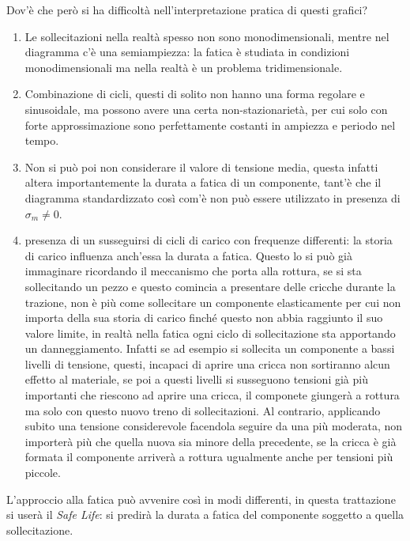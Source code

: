 		Dov'è che però si ha difficoltà nell'interpretazione pratica di questi grafici? 
		\begin{enumerate}
			
		\item Le sollecitazioni nella realtà spesso non sono monodimensionali, mentre nel diagramma c'è una semiampiezza: la fatica è studiata in condizioni monodimensionali ma nella realtà è un problema tridimensionale.
		
		\item Combinazione di cicli, questi di solito non hanno una forma regolare e sinusoidale, ma possono avere una certa non-stazionarietà, per cui solo con forte approssimazione sono perfettamente costanti in ampiezza e periodo nel tempo. 
		
		\item Non si può poi non considerare il valore di tensione media, questa infatti altera importantemente la durata a fatica di un componente, tant'è che il diagramma standardizzato così com'è non può essere utilizzato in presenza di $\sigma_m\ne0$.
		
		\item presenza di un susseguirsi di cicli di carico con frequenze differenti: la storia di carico influenza anch'essa la durata a fatica. Questo lo si può già immaginare ricordando il meccanismo che porta alla rottura, se si sta sollecitando un pezzo e questo comincia a presentare delle cricche durante la trazione, non è più come sollecitare un componente elasticamente per cui non importa della sua storia di carico finché questo non abbia raggiunto il suo valore limite, in realtà nella fatica ogni ciclo di sollecitazione sta apportando un danneggiamento. Infatti se ad esempio si sollecita un componente a bassi livelli di tensione, questi, incapaci di aprire una cricca non sortiranno alcun effetto al materiale, se poi a questi livelli si susseguono tensioni già più importanti che riescono ad aprire una cricca, il componete giungerà a rottura ma solo con questo nuovo treno di sollecitazioni. Al contrario, applicando subito una tensione considerevole facendola seguire da una più moderata, non importerà più che quella nuova sia minore della precedente, se la cricca è già formata il componente arriverà a rottura ugualmente anche per tensioni più piccole.
		\end{enumerate} 
		 
		L'approccio alla fatica può avvenire così in modi differenti, in questa trattazione si userà il \textit{Safe Life}: si predirà la durata a fatica del componente soggetto a quella sollecitazione. \newpage
		
